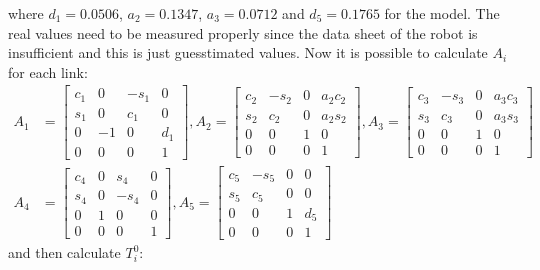 where $d_1 = 0.0506$, $a_2 = 0.1347$, $a_3 = 0.0712$ and $d_5 = 0.1765$ for the model. The real values need to be measured properly since the data sheet of the robot is insufficient and this is just guesstimated values. 
Now it is possible to calculate $A_i$ for each link: 
\begin{align*}
A_1 &= \begin{bmatrix} 
            c_1 & 0 & -s_1 & 0\\
            s_1 & 0 & c_1 & 0\\
            0 & -1 & 0 & d_1\\
            0 & 0 & 0 & 1
        \end{bmatrix},
A_2 = \begin{bmatrix} 
            c_2 & -s_2 & 0 & a_2c_2\\
            s_2 & c_2 & 0 & a_2s_2\\
            0 & 0 & 1 & 0\\
            0 & 0 & 0 & 1
        \end{bmatrix},
A_3 = \begin{bmatrix} 
            c_3 & -s_3 & 0 & a_3c_3\\
            s_3 & c_3 & 0 & a_3s_3\\
            0 & 0 & 1 & 0\\
            0 & 0 & 0 & 1
        \end{bmatrix}\\
A_4 &= \begin{bmatrix} 
            c_4 & 0 & s_4 & 0\\
            s_4 & 0 & -s_4 & 0\\
            0 & 1 & 0 & 0\\
            0 & 0 & 0 & 1
        \end{bmatrix},
A_5 = \begin{bmatrix} 
            c_5 & -s_5 & 0 & 0\\
            s_5 & c_5 & 0 & 0\\
            0 & 0 & 1 & d_5 \\
            0 & 0 & 0 & 1
        \end{bmatrix}
\end{align*}
 and then calculate $T_i^0$:
